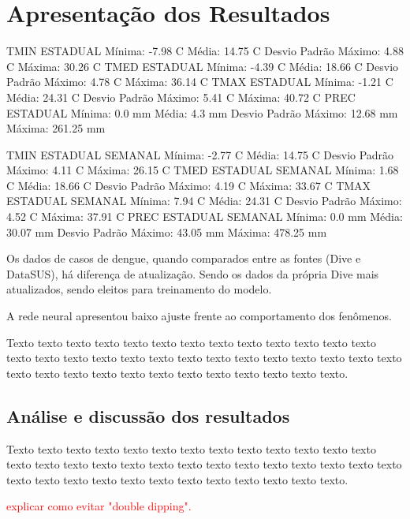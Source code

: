 \chapter{Apresentação dos Resultados}

TMIN ESTADUAL
Mínima: -7.98 C
Média: 14.75 C
Desvio Padrão Máximo: 4.88 C
Máxima: 30.26 C
TMED ESTADUAL
Mínima: -4.39 C
Média: 18.66 C
Desvio Padrão Máximo: 4.78 C
Máxima: 36.14 C
TMAX ESTADUAL
Mínima: -1.21 C
Média: 24.31 C
Desvio Padrão Máximo: 5.41 C
Máxima: 40.72 C
PREC ESTADUAL
Mínima: 0.0 mm
Média: 4.3 mm
Desvio Padrão Máximo: 12.68 mm
Máxima: 261.25 mm

TMIN ESTADUAL SEMANAL
Mínima: -2.77 C
Média: 14.75 C
Desvio Padrão Máximo: 4.11 C
Máxima: 26.15 C
TMED ESTADUAL SEMANAL
Mínima: 1.68 C
Média: 18.66 C
Desvio Padrão Máximo: 4.19 C
Máxima: 33.67 C
TMAX ESTADUAL SEMANAL
Mínima: 7.94 C
Média: 24.31 C
Desvio Padrão Máximo: 4.52 C
Máxima: 37.91 C
PREC ESTADUAL SEMANAL
Mínima: 0.0 mm
Média: 30.07 mm
Desvio Padrão Máximo: 43.05 mm
Máxima: 478.25 mm


\indent Os dados de casos de dengue, quando comparados entre as fontes (\acrshort{Dive} e \acrshort{DataSUS}), há diferença de atualização. Sendo os dados da própria \acrshort{Dive} mais atualizados, sendo eleitos para treinamento do modelo.

\indent A rede neural apresentou baixo ajuste frente ao comportamento dos fenômenos.

Texto texto texto texto texto texto texto texto texto texto texto texto texto texto texto texto texto texto texto texto texto texto texto texto texto texto texto texto texto texto texto texto texto texto texto texto texto texto texto.

\section{Análise e discussão dos resultados}

Texto texto texto texto texto texto texto texto texto texto texto texto texto texto texto texto texto texto texto texto texto texto texto texto texto texto texto texto texto texto texto texto texto texto texto texto texto texto texto.

\indent \textcolor{red}{explicar como evitar "double dipping".}


